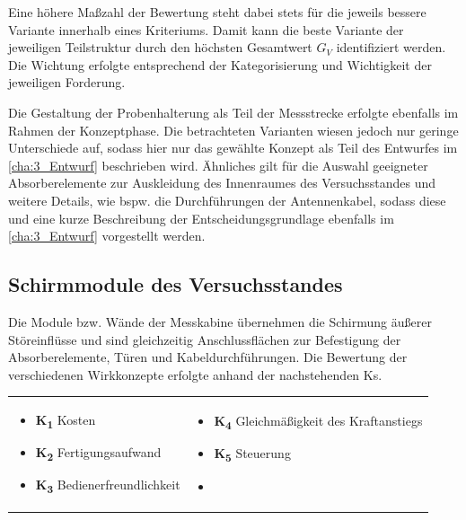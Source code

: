 Eine höhere Maßzahl der Bewertung steht dabei stets für die jeweils bessere Variante innerhalb eines Kriteriums. Damit kann die beste Variante der jeweiligen Teilstruktur durch den höchsten Gesamtwert $G_V$ identifiziert werden. Die Wichtung erfolgte entsprechend der Kategorisierung und Wichtigkeit der jeweiligen Forderung.
\par
\vspace{\linespace}
Die Gestaltung der Probenhalterung als Teil der Messstrecke erfolgte ebenfalls im Rahmen der Konzeptphase. Die betrachteten Varianten wiesen jedoch nur geringe Unterschiede auf, sodass hier nur das gewählte Konzept als Teil des Entwurfes im \Abschnitt\ref{cha:3_Entwurf} beschrieben wird. Ähnliches gilt für die Auswahl geeigneter Absorberelemente zur Auskleidung des Innenraumes des Versuchsstandes und weitere Details, wie bspw. die Durchführungen der Antennenkabel, sodass diese und eine kurze Beschreibung der Entscheidungsgrundlage ebenfalls im \Abschnitt\ref{cha:3_Entwurf} vorgestellt werden.


\subsection{Schirmmodule des Versuchsstandes}\label{cha:3_sub_Schirmmodule_Versuchsstand}

Die Module bzw. Wände der Messkabine übernehmen die Schirmung äußerer Störeinflüsse und sind gleichzeitig Anschlussflächen zur Befestigung der Absorberelemente, Türen und Kabeldurchführungen. Die Bewertung der verschiedenen Wirkkonzepte erfolgte anhand der nachstehenden \acp{K}.

\begin{tabular}{l l}
    \hspace*{1cm} \parbox[c][3cm]{7cm}{
        \begin{itemize}[]
            \item \textbf{K\textsubscript{1}} Kosten
            \item \textbf{K\textsubscript{2}} Fertigungsaufwand
            \item \textbf{K\textsubscript{3}} Bedienerfreundlichkeit
        \end{itemize}
    }&
    \parbox[c]{7cm}{
        \begin{itemize}[]
            \item \textbf{K\textsubscript{4}} Gleichmäßigkeit des Kraftanstiegs
            \item \textbf{K\textsubscript{5}} Steuerung
            \item
        \end{itemize}
    }
\end{tabular}

